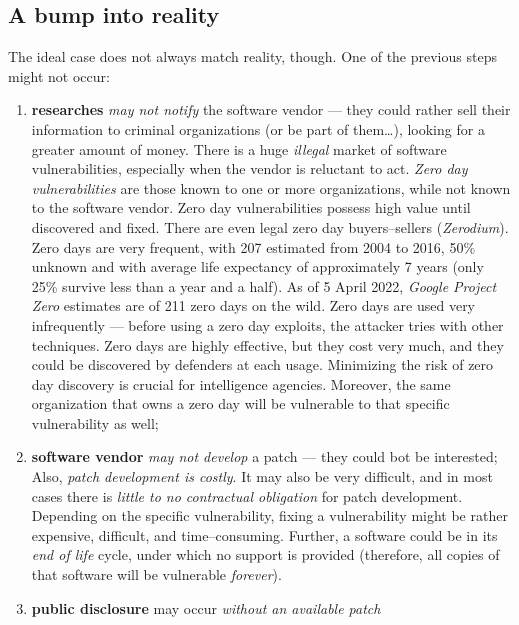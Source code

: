 \documentclass[10pt]{\classname}
\begin{document}
\subsection{A bump into reality}

The ideal case does not always match reality, though. One of the previous steps
might not occur:
\begin{enumerate}
    \item \textbf{researches} \emph{may not notify} the software vendor --- they
        could rather sell their information to criminal organizations (or be
        part of them\dots), looking for a greater amount of money. There is a
        huge \emph{illegal} market of software vulnerabilities, especially when
        the vendor is reluctant to act. \emph{Zero day vulnerabilities} are
        those known to one or more organizations, while not known to the
        software vendor. Zero day vulnerabilities possess high value until
        discovered and fixed. There are even legal zero day buyers--sellers
        (\emph{Zerodium}). Zero days are very frequent, with 207 estimated from
        2004 to 2016, 50\% unknown and with average life expectancy of
        approximately 7 years (only 25\% survive less than a year and a half).
        As of 5 April 2022, \emph{Google Project Zero} estimates are of 211
        zero days on the wild. Zero days are used very infrequently --- before
        using a zero day exploits, the attacker tries with other techniques.
        Zero days are highly effective, but they cost very much, and they could
        be discovered by defenders at each usage. Minimizing the risk of zero
        day discovery is crucial for intelligence agencies. Moreover, the same
        organization that owns a zero day will be vulnerable to that specific
        vulnerability as well;
    \item \textbf{software vendor} \emph{may not develop} a patch --- they could
        bot be interested; Also, \emph{patch development is costly}. It may
        also be very difficult, and in most cases there is \emph{little to no
        contractual obligation} for patch development. Depending on the
        specific vulnerability, fixing a vulnerability might be rather
        expensive, difficult, and time--consuming. Further, a software could be
        in its \emph{end of life} cycle, under which no support is provided
        (therefore, all copies of that software will be vulnerable
        \emph{forever}).
    \item \textbf{public disclosure} may occur \emph{without an available patch}

\end{enumerate}
\end{document}
